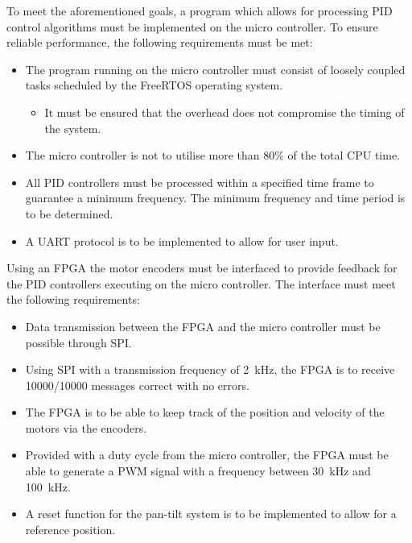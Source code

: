 \documentclass[../../main.tex]{subfiles}
\begin{document}
To meet the aforementioned goals, a program which allows for processing PID control algorithms must be implemented on the micro controller. To ensure reliable performance, the following requirements must be met:
\begin{itemize}
    \item The program running on the micro controller must consist of loosely coupled tasks scheduled by the FreeRTOS operating system.
    \begin{itemize}
        \item It must be ensured that the overhead does not compromise the timing of the system.
    \end{itemize}
    \item The micro controller is not to utilise more than 80\% of the total CPU time.
    \item All PID controllers must be processed within a specified time frame to guarantee a minimum frequency. The minimum frequency and time period is to be determined.
    \item A UART protocol is to be implemented to allow for user input.
\end{itemize}
Using an FPGA the motor encoders must be interfaced to provide feedback for the PID controllers executing on the micro controller. The interface must meet the following requirements:
\begin{itemize}
    \item Data transmission between the FPGA and the micro controller must be possible through SPI.
    \item Using SPI with a transmission frequency of \SI{2}{\kilo\hertz}, the FPGA is to receive 10000/10000 messages correct with no errors.
    \item The FPGA is to be able to keep track of the position and velocity of the motors via the encoders.
    \item Provided with a duty cycle from the micro controller, the FPGA must be able to generate a PWM signal with a frequency between \SI{30}{\kilo\hertz} and \SI{100}{\kilo\hertz}.
    \item A reset function for the pan-tilt system is to be implemented to allow for a reference position.
\end{itemize}
\end{document}
